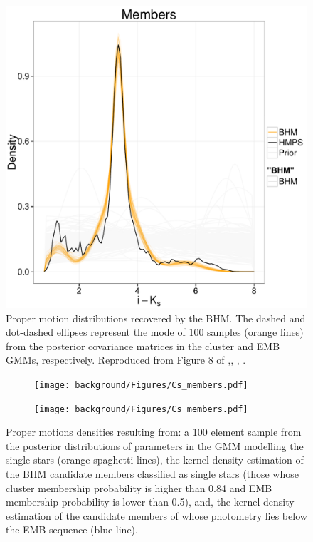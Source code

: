 \begin{figure}[ht!]
\begin{center}
\includegraphics[page=2,width=\textwidth]{background/Figures/MembersModel.pdf}
\caption{Proper motion distributions recovered by the BHM. The dashed and dot-dashed ellipses represent the mode of 100 samples (orange lines) from the posterior covariance matrices in the cluster and EMB GMMs, respectively. Reproduced from Figure 8 of \citet{Olivares2017},\textit{}, , .}
\label{fig:PM}
\end{center}
\end{figure}

\begin{figure}[ht!]
    \centering
    \begin{subfigure}[t]{0.45\textwidth}
    \centering
       \texttt{[image: background/Figures/Cs\_members.pdf]}
        \caption{}
    \end{subfigure}
    \begin{subfigure}[t]{0.45\textwidth}
    \centering
     \texttt{[image: background/Figures/Cs\_members.pdf]}
        \caption{}
    \end{subfigure}
\caption{Proper motions densities resulting from: a 100 element sample from the posterior distributions of parameters in the GMM modelling the single stars (orange spaghetti lines), the kernel density estimation of the BHM candidate members classified as single stars (those whose cluster membership probability is higher than 0.84 and EMB membership probability is lower than 0.5), and, the kernel density estimation of the candidate members of \citet{Bouy2015} whose photometry lies below the EMB sequence (blue line).}
\label{fig:PMCs}
\end{figure}

